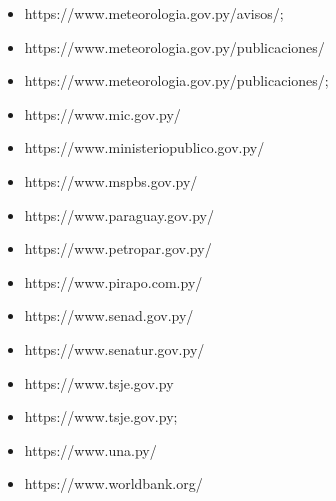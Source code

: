 \begin{itemize}
\item
  https:/\allowbreak /www.meteorologia.gov.py/\allowbreak avisos/\allowbreak ;
\item
  https:/\allowbreak /www.meteorologia.gov.py/\allowbreak publicaciones/\allowbreak 
\item
  https:/\allowbreak /www.meteorologia.gov.py/\allowbreak publicaciones/\allowbreak ;
\item
  https:/\allowbreak /www.mic.gov.py/\allowbreak 
\item
  https:/\allowbreak /www.ministeriopublico.gov.py/\allowbreak 
\item
  https:/\allowbreak /www.mspbs.gov.py/\allowbreak 
\item
  https:/\allowbreak /www.paraguay.gov.py/\allowbreak 
\item
  https:/\allowbreak /www.petropar.gov.py/\allowbreak 
\item
  https:/\allowbreak /www.pirapo.com.py/\allowbreak 
\item
  https:/\allowbreak /www.senad.gov.py/\allowbreak 
\item
  https:/\allowbreak /www.senatur.gov.py/\allowbreak 
\item
  https:/\allowbreak /www.tsje.gov.py
\item
  https:/\allowbreak /www.tsje.gov.py;
\item
  https:/\allowbreak /www.una.py/\allowbreak 
\item
  https:/\allowbreak /www.worldbank.org/\allowbreak 
\end{itemize}
